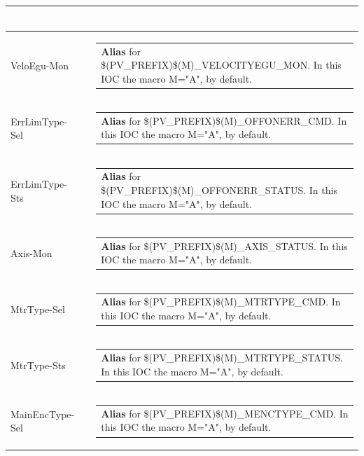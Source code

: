 \documentclass[openany]{article}
\begin{document}
\begin{longtable}{| m{4.5cm} m{2.5cm}  m{8.5cm} |}
\begin{tabular}{@{}m{6cm}@{}}
            \end{tabular} \hypertarget{pv:velo-egu-mon}{}\\ \hline
        VeloEgu-Mon &  & \begin{tabular}{@{}m{6cm}@{}}
                \textbf{\color{blue} Alias} for \$(PV\_PREFIX)\$(M)\_VELOCITYEGU\_MON. In this IOC the macro M="A", by default.
            \end{tabular} \hypertarget{pv:err-lim-type}{}\\ \hline
        ErrLimType-Sel &  & \begin{tabular}{@{}m{6cm}@{}}
                \textbf{\color{blue} Alias} for \$(PV\_PREFIX)\$(M)\_OFFONERR\_CMD. In this IOC the macro M="A", by default.
            \end{tabular} \hypertarget{}{}\\ \hline
        ErrLimType-Sts &  & \begin{tabular}{@{}m{6cm}@{}}
                \textbf{\color{blue} Alias} for \$(PV\_PREFIX)\$(M)\_OFFONERR\_STATUS. In this IOC the macro M="A", by default.
            \end{tabular} \hypertarget{pv:axis-mon}{}\\ \hline
        Axis-Mon &  & \begin{tabular}{@{}m{6cm}@{}}
                \textbf{\color{blue} Alias} for \$(PV\_PREFIX)\$(M)\_AXIS\_STATUS. In this IOC the macro M="A", by default.
            \end{tabular} \hypertarget{pv:mtr-type}{}\\ \hline
        MtrType-Sel &  & \begin{tabular}{@{}m{6cm}@{}}
                \textbf{\color{blue} Alias} for \$(PV\_PREFIX)\$(M)\_MTRTYPE\_CMD. In this IOC the macro M="A", by default.
            \end{tabular} \hypertarget{}{}\\ \hline
        MtrType-Sts &  & \begin{tabular}{@{}m{6cm}@{}}
                \textbf{\color{blue} Alias} for \$(PV\_PREFIX)\$(M)\_MTRTYPE\_STATUS. In this IOC the macro M="A", by default.
            \end{tabular} \hypertarget{pv:main-enc-type}{}\\ \hline
        MainEncType-Sel &  & \begin{tabular}{@{}m{6cm}@{}}
                \textbf{\color{blue} Alias} for \$(PV\_PREFIX)\$(M)\_MENCTYPE\_CMD. In this IOC the macro M="A", by default.

\end{tabular}
\end{longtable}
\end{document}
